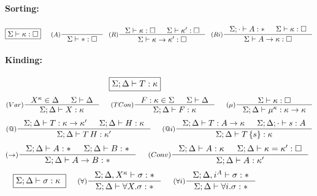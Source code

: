 \begin{figure}
\begin{framed}
\paragraph{Sorting:}
\[ \fbox{$\Sigma |- \kappa : \square$}
 ~~~~
  \inference[($A$)]{}{\Sigma |- *:\square}
 ~~
   \inference[($R$)]{ \Sigma |- \kappa:\square
                    & \Sigma |- \kappa':\square }
                    { \Sigma |- \kappa -> \kappa' : \square }
 ~~
   \inference[($Ri$)]{\Sigma;\cdot |- A:* & \Sigma |- \kappa:\square}
                     {\Sigma |- A -> \kappa : \square}
\]

\paragraph{Kinding:}
\[ \fbox{$\Sigma;\Delta |- T : \kappa$} \]
\[ \inference[($Var$)]{X^\kappa\in\Delta & \Sigma |- \Delta}
                      {\Sigma;\Delta |- X : \kappa}
 ~~~~
   \inference[($TCon$)]{F:\kappa\in\Sigma & \Sigma |- \Delta}
                       {\Sigma;\Delta |- F : \kappa}
 ~~~~
   \inference[($\mu$)]{\Sigma |- \kappa : \square}
                       {\Sigma;\Delta |- \mu^\kappa : \kappa -> \kappa}
\]
\[ \inference[($@$)]{ \Sigma;\Delta |- T : \kappa -> \kappa'
                    & \Sigma;\Delta |- H : \kappa }
                    {\Sigma;\Delta |- T\,H : \kappa'}
 ~~~~
   \inference[($@i$)]{ \Sigma;\Delta |- T : A -> \kappa
                     & \Sigma;\Delta;\cdot |- s : A }
                     {\Sigma;\Delta |- T\,\{s\} : \kappa}
\]
\[ \inference[($->$)]{\Sigma;\Delta |- A : * & \Sigma;\Delta |- B : *}
                     {\Sigma;\Delta |- A -> B : * }
 ~~~~
   \inference[($Conv$)]{ \Sigma;\Delta |- A : \kappa
                       & \Sigma;\Delta |- \kappa = \kappa' : \square }
                       {\Sigma;\Delta |- A : \kappa'}
\]
\[ \fbox{$\Sigma;\Delta |- \sigma : \kappa$ }
 ~~~~
   \inference[($\forall$)]{\Sigma;\Delta, X^\kappa |- \sigma : *}
                          {\Sigma;\Delta |- \forall X . \sigma : *}
 ~~~~
   \inference[($\forall i$)]{\Sigma;\Delta, i^A |- \sigma : *}
                            {\Sigma;\Delta |- \forall i . \sigma : *}
\]



\end{framed}
\end{figure}
